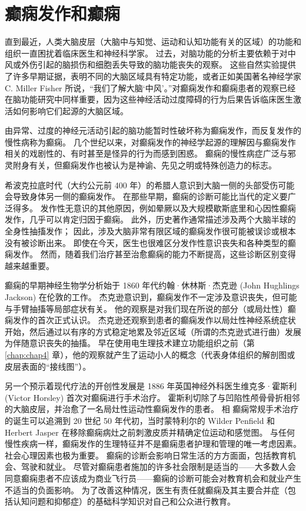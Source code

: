 \chapter{癫痫发作和癫痫} \label{chap:chap58}
直到最近，人类大脑皮层（大脑中与知觉、运动和认知功能有关的区域）的功能和组织一直困扰着临床医生和神经科学家。 过去，对脑功能的分析主要依赖于对中风或外伤引起的脑损伤和细胞丢失导致的脑功能丧失的观察。 这些自然实验提供了许多早期证据，表明不同的大脑区域具有特定功能，或者正如美国著名神经学家 C. Miller Fisher 所说，“我们了解大脑‘中风’。”对癫痫发作和癫痫患者的观察已经 在脑功能研究中同样重要，因为这些神经活动过度障碍的行为后果告诉临床医生激活如何影响它们起源的大脑区域。

由异常、过度的神经元活动引起的脑功能暂时性破坏称为癫痫发作，而反复发作的慢性病称为癫痫。 几个世纪以来，对癫痫发作的神经学起源的理解因与癫痫发作相关的戏剧性的、有时甚至是怪异的行为而感到困惑。 癫痫的慢性病症广泛与邪灵附身有关，但癫痫发作也被认为是神谕、先见之明或特殊创造力的标志。

希波克拉底时代（大约公元前 400 年）的希腊人意识到大脑一侧的头部受伤可能会导致身体另一侧的癫痫发作。 在那些早期，癫痫的诊断可能比当代的定义要广泛得多。 发作性无意识的其他原因，例如晕厥以及大规模歇斯底里和心因性癫痫发作，几乎可以肯定归因于癫痫。 此外，历史著作通常描述涉及两个大脑半球的全身性抽搐发作； 因此，涉及大脑非常有限区域的癫痫发作很可能被误诊或根本没有被诊断出来。 即使在今天，医生也很难区分发作性意识丧失和各种类型的癫痫发作。 然而，随着我们治疗甚至治愈癫痫的能力不断提高，这些诊断区别变得越来越重要。

癫痫的早期神经生物学分析始于 1860 年代约翰·休林斯·杰克逊 (John Hughlings Jackson) 在伦敦的工作。 杰克逊意识到，癫痫发作不一定涉及意识丧失，但可能与手臂抽搐等局部症状有关。 他的观察是对我们现在所说的部分（或局灶性）癫痫发作的首次正式认识。 杰克逊还观察到患者的癫痫发作以局灶性神经系统症状开始，然后通过以有序的方式稳定地累及邻近区域（所谓的杰克逊式进行曲）发展为伴随意识丧失的抽搐。 早在使用电生理技术建立功能组织之前（第 \ref{chap:chap4} 章），他的观察就产生了运动小人的概念（代表身体组织的解剖图或皮层表面的“接线图”）。

另一个预示着现代疗法的开创性发展是 1886 年英国神经外科医生维克多·霍斯利 (Victor Horsley) 首次对癫痫进行手术治疗。 霍斯利切除了与凹陷性颅骨骨折相邻的大脑皮层，并治愈了一名局灶性运动性癫痫发作的患者。 相 癫痫常规手术治疗的诞生可以追溯到 20 世纪 50 年代初，当时蒙特利尔的 Wilder Penfield 和 Herbert Jasper 在移除癫痫病灶之前刺激皮质并精确定位运动和感觉图。 与任何慢性疾病一样，癫痫发作的生理特征并不是癫痫患者护理和管理的唯一考虑因素。 社会心理因素也极为重要。 癫痫的诊断会影响日常生活的方方面面，包括教育机会、驾驶和就业。 尽管对癫痫患者施加的许多社会限制是适当的——大多数人会同意癫痫患者不应该成为商业飞行员——癫痫的诊断可能会对教育机会和就业产生不适当的负面影响。 为了改善这种情况，医生有责任就癫痫及其主要合并症（包括认知问题和抑郁症）的基础科学知识对自己和公众进行教育。

